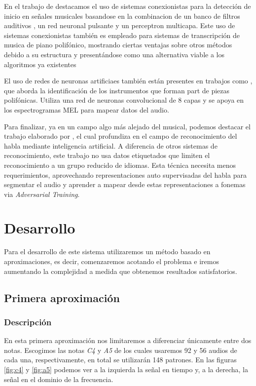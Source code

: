 \documentclass[12pt]{article}
\begin{document}
\bigskip
En el trabajo de \cite{marolt2002neural} destacamos el uso de sistemas conexionistas para la detección de inicio en señales musicales basandose en la combinacion de un banco de filtros auditivos
, un red neuronal pulsante y un perceptron multicapa. Este uso de sistemas conexionistas también es empleado para sistemas de transcripción de musica de piano polifónico, mostrando ciertas ventajas sobre otros métodos debido a su estructura y 
presentándose como una alternativa viable a los algoritmos ya existentes

\bigskip
El uso de redes de neuronas artificiaes también están presentes en trabajos como \cite{solanki2019music}, que aborda la identificación de
los instrumentos que forman part de piezas polifónicas. Utiliza una red de neuronas convolucional de 8 capas y se apoya en los espectrogramas 
MEL para mapear datos del audio.

\bigskip
Para finalizar, ya en un campo algo más alejado del musical, podemos destacar el trabajo elaborado por \cite{baevski2021unsupervised},
el cual profundiza en el campo de reconocimiento del habla mediante inteligencia artificial.
A diferencia de otros sistemas de reconocimiento, este trabajo no usa datos etiquetados que limiten el reconocimiento a un grupo reducido de idiomas. 
Esta técnica necesita menos requerimientos, aprovechando representaciones auto supervisadas del habla para segmentar el audio y aprender a 
mapear desde estas representaciones a fonemas via \textit{Adversarial Training}.

\bigskip

\newpage
\section{Desarrollo}
\label{Desarrollo}
Para el desarrollo de este sistema utilizaremos un método basado en aproximaciones, es decir, comenzaremos acotando el problema e iremos aumentando
la complejidad a medida que obtenemos resultados satisfatorios.
\subsection{Primera aproximación}
\label{Primera aproximación}

\subsubsection{Descripción}
En esta primera aproximación nos limitaremos a diferenciar únicamente entre dos notas. 
Escogimos las notas \textit{C4} y \textit{A5} de los cuales usaremos 92 y 56 audios de cada una, respectivamente, en total
se utilizarán 148 patrones. En las figuras \ref{fig:c4} y \ref{fig:a5} podemos ver a la izquierda la señal en tiempo y, a la derecha,
la señal en el dominio de la frecuencia.
\end{document}

